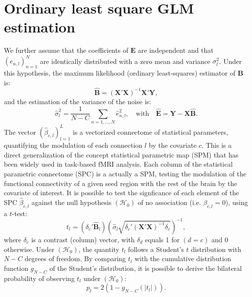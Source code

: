 \documentclass[authoryear,preprint,review]{elsarticle}
\begin{document}
\section{Ordinary least square GLM estimation}
\label{app_glm}
We further assume that the coefficients of $\mathbf{E}$ are independent and that $(e_{n,l})_{n=1}^N$ are identically distributed with a zero mean and variance $\sigma_l^2$. Under this hypothesis, the maximum likelihood (ordinary least-squares) estimator of $\mathbf{B}$ is:
\begin{equation}
 \label{eq_lse}
 \hat{\mathbf{B}} = (\mathbf{X}'\mathbf{X})^{-1}\mathbf{X}'\mathbf{Y},
\end{equation}
and the estimation of the variance of the noise is:
\begin{equation}
 \label{var_noise}
 \hat{\sigma}_l^2 = \frac{1}{N-C}\sum_{n=1,\dots,N} \hat{e}_{n,l}^2, \quad \textrm{with} \quad \hat{\mathbf{E}} = \mathbf{Y}-\mathbf{X}\hat{\mathbf{B}}.
\end{equation}
The vector $(\hat{\beta}_{c,l})_{l=1}^L$ is a vectorized connectome of statistical parameters, quantifying the modulation of each connection $l$ by the covariate $c$. This is a direct generalization of the concept statistical parametric map (SPM) that has been widely used in task-based fMRI analysis. Each column of the statistical parametric connectome (SPC) is a actually a SPM, testing the modulation of the functional connectivity of a given seed region with the rest of the brain by the covariate of interest. It is possible to test the signficance of each element of the SPC $\hat{\beta}_{c,l}$ against the null hypothesis $(\mathcal{H}_0)$ of no association (i.e. $\beta_{c,l} = 0$), using a $t$-test:
\begin{equation}
 t_l = (\delta_c'\hat{\mathbf{B}}_l)\left(\hat{\sigma}_l\sqrt{\delta_c'(\mathbf{X}'\mathbf{X})^{-1}\delta_c}\right)^{-1},
\end{equation}
where $\delta_c$ is a contrast (column) vector, with $\delta_{d}$ equals 1 for $(d=c)$ and 0 otherwise. Under $(\mathcal{H}_0)$, the quantity $t_l$ follows a Student's $t$ distribution with $N-C$ degrees of freedom. By comparing $t_l$ with the cumulative distribution function $g_{N-C}$ of the Student's distribution, it is possible to derive the bilateral probability of observing $t_l$ under $(\mathcal{H}_0)$:
\begin{equation}
 p_l = 2 \left( 1-g_{N-C}(|t_l|) \right) .
\end{equation}
\end{document}
